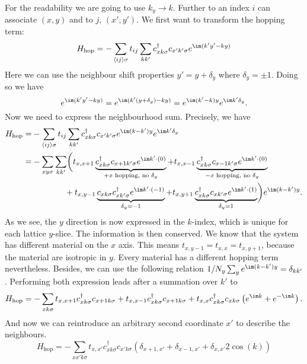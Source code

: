 \documentclass[../main.tex]{subfile}
\begin{document}
For the readability we are going to use $k_y \rightarrow k$.
Further to an index $i$  can associate $(x,y)$ and to $j$, $(x',y')$.
We first want to transform the hopping term:
\begin{equation*}
    H_{\text{hop}} = -\sum_{\langle ij\rangle \sigma} t_{ij} \sum_{kk'} c^{\dagger}_{x k\sigma} c_{x' k'\sigma} e^{\im (k' y' - k y)}
\end{equation*}
Here we can use the neighbour shift properties $y' = y + \delta_y$ where $\delta_y = \pm 1$. Doing so we have 
\[
    e^{\im (k' y' - k y)} = e^{\im (k' (y+\delta_y) -  k y)} = e^{\im (k' -  k)y}e^{\im k'\delta_y}.
\]
Now we need to express the neighbourhood sum. Precisely, we have
\begin{align*}
        H_{\text{hop}} =& -\sum_{\langle ij\rangle \sigma} t_{ij} \sum_{kk'} c^{\dagger}_{x k\sigma} c_{x' k'\sigma}  e^{\im (k -  k')y}e^{\im k'\delta_y}\\
                        =& -\sum_{xy \sigma} \sum_{kk'}  \biggl( t_{x,x+1} \underbrace{c_{x k\sigma}^{\dagger} c_{x+1 k'\sigma}e^{\im k'\cdot (0)}}_{\text{$+x$ hopping, no $\delta_y$}} +  t_{x,x-1} \underbrace{c_{x k\sigma}^{\dagger} c_{x-1 k'\sigma} e^{\im k'\cdot (0)}}_{\text{$-x$ hopping, no $\delta_y$}}\\
                        & ~~~~~~~~~~~~+t_{x,y-1} \underbrace{c_{x k\sigma} c_{x k'\sigma}^{\dagger} e^{\im k'\cdot (-1)}}_{\delta_y = -1} + t_{x,y+1} \underbrace{c_{x k\sigma}^{\dagger} c_{x k'\sigma}e^{\im k'\cdot (1)}}_{\delta_y = 1}\biggr)e^{\im (k -  k')y}.
\end{align*}
As we see, the $y$ direction is now expressed in the $k$-index, which is unique for each lattice $y$-slice. The information is then conserved. 
We know that the system has different material on the $x$ axis. This means $t_{x,y-1} = t_{x,x} = t_{x,y+1}$, because the material are isotropic in $y$. Every material has a 
different hopping term nevertheless. Besides, we can use the following relation $1/N_y \sum_{y} e^{\im (k -  k')y} = \delta_{kk'}$. Performing both expression leads after a summation over $k'$ to
\begin{equation*}
    H_{\text{hop}} = -\sum_{x k \sigma} t_{x,x+1} c_{x k\sigma}^{\dagger} c_{x+1 k\sigma} + t_{x,x-1} c_{x k\sigma}^{\dagger} c_{x+1 k\sigma} +  t_{x,x} c_{x k\sigma}^{\dagger} 
    c_{xk\sigma}\left(e^{\im k} + e^{-\im k}\right).
\end{equation*}
And now we can reintroduce an arbitrary second coordinate $x'$ to describe the neighbours.
\begin{equation}
    H_{\text{hop}} = -\sum_{xx' k \sigma} t_{x,x'} c_{x k\sigma}^{\dagger} c_{x' k\sigma} \left(\delta_{x+1,x'} + \delta_{x-1,x'} + \delta_{x,x'} 2 \cos(k)\right)
\end{equation}
\end{document}
